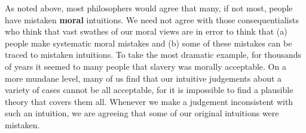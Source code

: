 \documentclass[
  11pt,
  letterpaper,
  DIV=11,
  numbers=noendperiod,
  oneside]{scrartcl}
\begin{document}
As noted above, most philosophers would agree that many, if not most,
people have mistaken \textbf{moral} intuitions. We need not agree with
those consequentialists who think that vast swathes of our moral views
are in error to think that (a) people make systematic moral mistakes and
(b) some of these mistakes can be traced to mistaken intuitions. To take
the most dramatic example, for thousands of years it seemed to many
people that slavery was morally acceptable. On a more mundane level,
many of us find that our intuitive judgements about a variety of cases
cannot be all acceptable, for it is impossible to find a plausible
theory that covers them all. Whenever we make a judgement inconsistent with such an
intuition, we are agreeing that some of our original intuitions were
mistaken.
\end{document}
